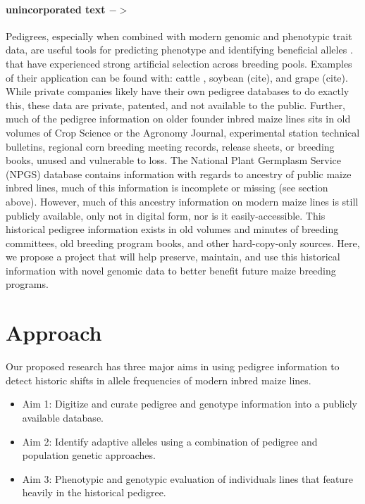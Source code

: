 \documentclass[draft,12pt]{article}
\begin{document}
\paragraph{unincorporated text $->$}
Pedigrees, especially when combined with modern genomic and phenotypic trait data, are useful tools for predicting phenotype \citep{crossa2010prediction} and identifying beneficial alleles \citep{sebastian1995method}.
 that have experienced strong artificial selection across breeding pools. Examples of their application can be found with: cattle \citep{Decker:2012kd}, soybean (cite), and grape (cite). 
While private companies likely have their own pedigree databases to do exactly this, these data are private, patented, and not available to the public. 
Further, much of the pedigree information on older founder inbred maize lines sits in old volumes of Crop Science or the Agronomy Journal, experimental station technical bulletins, regional corn breeding meeting records, release sheets, or breeding books, unused and vulnerable to loss.  
The National Plant Germplasm Service (NPGS) database contains information with regards to ancestry of public maize inbred lines, much of this information is incomplete or missing (see section above). 
However, much of this ancestry information on modern maize lines  is still publicly available, only not in digital form, nor is it easily-accessible. This historical pedigree information exists in old volumes and minutes of breeding committees, old breeding program books, and other hard-copy-only sources. Here, we propose a project that will help preserve, maintain, and use this historical information with novel genomic data to better benefit future maize breeding programs.

\section*{Approach}
\label{sec:approach}
Our proposed research has three major aims in using pedigree information to detect historic shifts in allele frequencies of modern inbred maize lines.

\begin{itemize}
\item Aim 1: Digitize and curate pedigree and genotype information into a publicly available database. 
\item Aim 2: Identify adaptive alleles using a combination of pedigree and population genetic approaches.
\item Aim 3: Phenotypic and genotypic evaluation of individuals lines that feature heavily in the historical pedigree.

\end{itemize}
\end{document}
